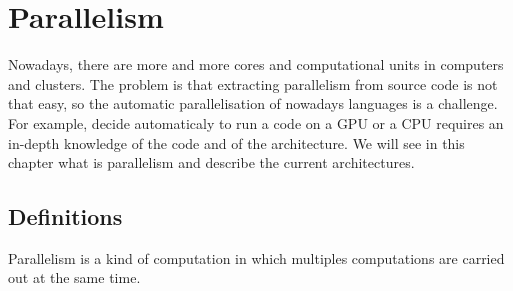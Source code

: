 \chapter{Parallelism}\label{ch:Parallelism}
Nowadays, there are more and more cores and computational units in computers and clusters. The problem is that extracting parallelism from source code is not that easy, so the automatic parallelisation of nowadays languages is a challenge. For example, decide automaticaly to run a code on a \ac{GPU} or a \ac{CPU} requires an in-depth knowledge of the code and of the architecture. We will see in this chapter what is parallelism and describe the current architectures.

\section{Definitions}
Parallelism is a kind of computation in which multiples computations are carried out at the same time.


